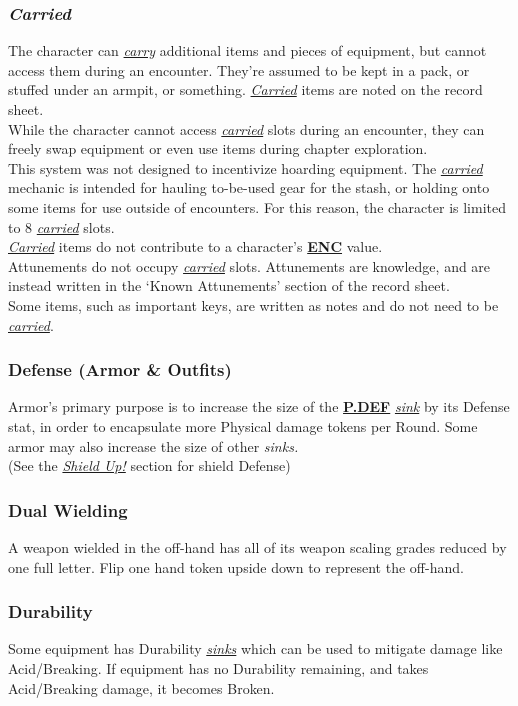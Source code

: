 \documentclass[12pt]{article}
\newcommand{\refto}[1]{\hyperlink{#1}{\textbf{#1}}}
\newcommand{\reftoit}[1]{\hyperlink{#1}{\emph{#1}}}
\begin{document}
\begin{multicols*}{2}
\subsubsection{\emph{Carried}}
\hypertarget{Carried}{}\hypertarget{carried}{}\hypertarget{carry}{}
The character can \reftoit{carry} additional items and pieces of equipment, but cannot access them during an encounter. They’re assumed to be kept in a pack, or stuffed under an armpit, or something. \reftoit{Carried} items are noted on the record sheet.\\
While the character cannot access \reftoit{carried} slots during an encounter, they can freely swap equipment or even use items during chapter exploration.\\
This system was not designed to incentivize hoarding equipment. The \reftoit{carried} mechanic is intended for hauling to-be-used gear for the stash, or holding onto some items for use outside of encounters. For this reason, the character is limited to 8 \reftoit{carried} slots.\\
\reftoit{Carried} items do not contribute to a character’s \refto{ENC} value.\\
Attunements do not occupy \reftoit{carried} slots. Attunements are knowledge, and are instead written in the ‘Known Attunements’ section of the record sheet.\\
Some items, such as important keys, are written as notes and do not need to be \reftoit{carried}.

\subsubsection{Defense (Armor \& Outfits)}
Armor’s primary purpose is to increase the size of the \refto{P.DEF} \reftoit{sink} by its Defense stat, in order to encapsulate more Physical damage tokens per Round. Some armor may also increase the size of other \emph{sinks.}\\
(See the \reftoit{Shield Up!} section for shield Defense)

\subsubsection{Dual Wielding}
A weapon wielded in the off-hand has all of its weapon scaling grades reduced by one full letter. Flip one hand token upside down to represent the off-hand.

\subsubsection{Durability}
Some equipment has Durability \reftoit{sinks} which can be used to mitigate damage like Acid/Breaking. If equipment has no Durability remaining, and takes Acid/Breaking damage, it becomes Broken.


\end{multicols*}
\end{document}
